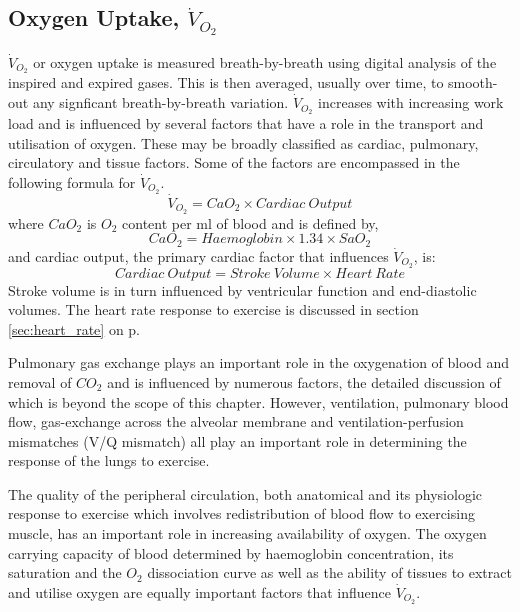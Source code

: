 \subsection{Oxygen Uptake, $\dot{V}_{O_2}$}

$\dot{V}_{O_2}$ or oxygen uptake is measured breath-by-breath using digital analysis of the inspired and expired gases. This is then averaged, usually over time, to smooth-out any signficant breath-by-breath variation. $\dot{V}_{O_2}$ increases with increasing work load and is influenced by several factors that have a role in the transport and utilisation of oxygen. These may be broadly classified as cardiac, pulmonary, circulatory and tissue factors. Some of the factors are encompassed in the following formula for $\dot{V}_{O_2}$.
\begin{equation} \label{eq:oxygen_consumption}
	\dot{V}_{O_2} = CaO_2 \times Cardiac\ Output
\end{equation}
where $CaO_2$ is $O_2$ content per ml of blood and is defined by,
\begin{equation} \label{eq:CaO2}
	CaO_2 = Haemoglobin \times 1.34 \times SaO_2
\end{equation}
and
cardiac output, the primary cardiac factor that influences $\dot{V}_{O_2}$, is:
\begin{equation} \label{eq:CO=SVxHR}
	Cardiac\ Output = Stroke\ Volume \times Heart\ Rate
\end{equation}
Stroke volume is in turn influenced by ventricular function and end-diastolic volumes. The heart rate response to exercise is discussed in section \ref{sec:heart_rate} on p\pageref{sec:heart_rate}.

Pulmonary gas exchange plays an important role in the oxygenation of blood and removal of $CO_2$ and is influenced by numerous factors, the detailed discussion of which is beyond the scope of this chapter. However, ventilation, pulmonary blood flow, gas-exchange across the alveolar membrane and ventilation-perfusion mismatches (V/Q mismatch) all play an important role in determining the response of the lungs to exercise.

The quality of the peripheral circulation, both anatomical and its physiologic response to exercise which involves redistribution of blood flow to exercising muscle, has an important role in increasing availability of oxygen. The oxygen carrying capacity of blood determined by haemoglobin concentration, its saturation and the $O_2$ dissociation curve as well as the ability of tissues to extract and utilise oxygen are equally important factors that influence $\dot{V}_{O_2}$.

